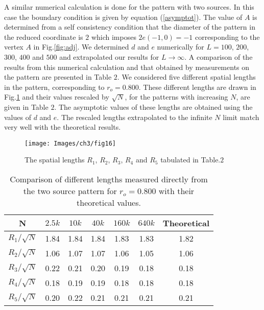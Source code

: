\documentclass[11pt,a4paper]{book}
\begin{document}
A similar numerical calculation is done for the pattern with two sources. In this case
the boundary condition is given by equation (\ref{asymptot}). 
The value of $A$ is determined from a self 
consistency condition that the diameter of the pattern in the reduced
coordinate is $2$ which imposes $2e(-1,0)=-1$ corresponding to the vertex $A$
in Fig.\ref{fig:adj}. 
We determined $d$ and $e$ numerically
for $L=100$, $200$, $300$, $400$ and $500$ and extrapolated our results for 
$L\rightarrow \infty$. 
A comparison of the results from this numerical calculation and that obtained by
measurements on the pattern are presented in Table $2$. We
considered five different spatial lengths in the pattern, corresponding to $r_{o}=0.800$.
These different lengths are drawn in Fig.\ref{fig:lengths} and their values rescaled by $\sqrt{N}$, for the patterns
with increasing $N$, are given in Table $2$. The asymptotic values of these lengths are
obtained using the values of $d$ and $e$. The rescaled
lengths extrapolated to the infinite $N$ limit match very well with the theoretical results.
\begin{figure}
\begin{center}
\texttt{[image: Images/ch3/fig16]}
\end{center}
\caption{ The spatial lengths $R_{1}$, $R_{2}$, $R_{3}$, $R_{4}$ and $R_{5}$ tabulated in Table.$2$}
\label{fig:lengths}
\end{figure}
\begin{table}
  \begin{center}
    \begin{tabular}{|c||c|c|c|c|c|c|}
      \hline
      ~N~ & $2.5k$ & $10k$ & $40k$ & $160k$ & $640k$ & Theoretical \\
      \hline
      \hline
      $R_{1}/\sqrt{N}$ & 1.84 & 1.84 & 1.84 & 1.83 &  1.83 & 1.82  \\
      \hline
      $R_{2}/\sqrt{N}$ & 1.06 & 1.07 & 1.07 & 1.06 & 1.05 & 1.06 \\
      \hline
      $R_{3}/\sqrt{N}$ & 0.22 & 0.21 & 0.20 & 0.19 & 0.18 & 0.18 \\
      \hline
      $R_{4}/\sqrt{N}$ & 0.18 & 0.19 & 0.19 &  0.18 & 0.18 & 0.18 \\
      \hline
      $R_{5}/\sqrt{N}$ & 0.20 & 0.22 & 0.21 & 0.21 & 0.21 & 0.21 \\
      \hline
    \end{tabular}
    \caption{Comparison of different lengths measured directly from the two source pattern
for $r_{o}=0.800$ with their theoretical values.}
  \end{center}
  \label{table:second}
\end{table}
\end{document}
